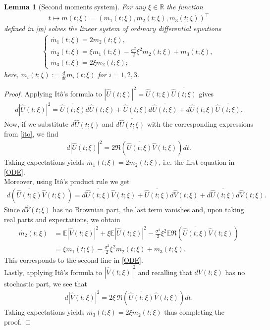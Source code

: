 \documentclass{article}
\newcommand{\wh}{\widehat}
\def\E{\mathbb{E}}
\newtheorem{lemma}[theorem]{Lemma}
\begin{document}
\begin{lemma}[Second moments system]\label{lem:momentDerivation}
For any $\xi\in\mathbb{R}$ the function 
\begin{align*}
t\mapsto m(t;\xi)=(m_1(t;\xi),m_2(t;\xi),m_3(t;\xi))^{\top} 
\end{align*}
defined in \eqref{m} solves the linear system of ordinary differential equations
\begin{align}\label{ODE}
\begin{cases}
\dot{m_1}(t;\xi) = 2m_2(t;\xi),\\
\dot{m_2}(t;\xi) = \xi m_1(t;\xi) - \frac{\sigma^2}{2}\xi^2 m_2(t;\xi)+m_3(t;\xi),\\
\dot{m_3}(t;\xi) = 2\xi m_2(t;\xi);
\end{cases}
\end{align}
here, $\dot{m_i}(t;\xi):=\frac{d}{dt}m_i(t;\xi)$ for $i=1,2,3$. 
\end{lemma}

\begin{proof}
Applying It\^o's formula to $|\wh U(t;\xi)|^2=\wh U(t;\xi)\overline{\wh U(t;\xi)}$ gives
\begin{align*}
d|\wh U(t;\xi)|^2
= \overline{\wh U(t;\xi)}d\wh U(t;\xi) + \wh U(t;\xi) d\overline{\wh U(t;\xi)} + d\wh U(t;\xi)\overline{\wh U(t;\xi)}.
\end{align*}
Now, if we substitute $d\wh U(t;\xi)$ and $d\overline{\wh U(t;\xi)}$ with the corresponding expressions from \eqref{ito}, we find
\begin{align*}
d|\wh U(t;\xi)|^2
= 2\Re(\overline{\wh U(t;\xi)}\wh V(t;\xi))dt.
\end{align*}
Taking expectations yields $\dot{m_1}(t;\xi) = 2m_2(t;\xi)$, i.e.  the first equation in \eqref{ODE}.\\
Moreover, using It\^o's product rule we get
\begin{align*}
d(\overline{\wh U(t;\xi)}\wh V(t;\xi))=d\overline{\wh U(t;\xi)}\wh V(t;\xi)+\overline{\wh U(t;\xi)}d\wh V(t;\xi)+d\overline{\wh U(t;\xi)}d\wh V(t;\xi).
\end{align*}
Since $d\wh V(t;\xi)$ has no Brownian part, the last term vanishes and, upon taking real parts and expectations, we obtain
\begin{align*}
\dot{m_2}(t;\xi)&=\E|\wh V(t;\xi)|^2 + \xi\E|\wh U(t;\xi)|^2 - \frac{\sigma^2}{2}\xi^2\E\Re(\overline{\wh U(t;\xi)}\wh V(t;\xi))\\
&= \xi m_1(t;\xi) - \frac{\sigma^2}{2}\xi^2 m_2(t;\xi)+m_3(t;\xi).
\end{align*}
This corresponds to the second line in \eqref{ODE}.\\
Lastly, applying It\^o's formula to $|\wh V(t;\xi)|^2$ and recalling that $dV(t;\xi)$ has no stochastic part, we see that
\begin{align*}
d|\wh V(t;\xi)|^2 = 2\xi\,\Re(\overline{\wh U(t;\xi)}\wh V(t;\xi))dt.
\end{align*}
Taking expectations yields $\dot{m_3}(t;\xi) = 2\xi m_2(t;\xi)$ thus completing the proof.
\end{proof}
\end{document}
